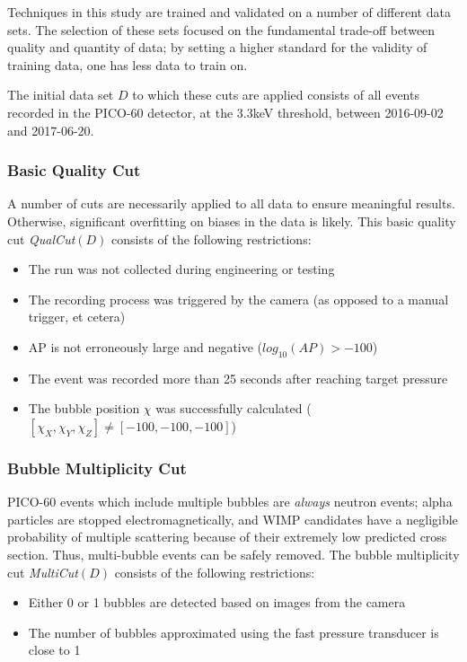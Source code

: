 \documentclass[10pt]{article}
\begin{document}
Techniques in this study are trained and validated on a number of different data sets. The selection of these sets focused on the fundamental trade-off between quality and quantity of data; by setting a higher standard for the validity of training data, one has less data to train on.

The initial data set $D$ to which these cuts are applied consists of all events recorded in the PICO-60 detector, at the 3.3keV threshold, between 2016-09-02 and 2017-06-20.

\subsubsection{Basic Quality Cut}

A number of cuts are necessarily applied to all data to ensure meaningful results. Otherwise, significant overfitting on biases in the data is likely. This basic quality cut {\it QualCut}$(D)$ consists of the following restrictions:

\begin{itemize}
    \item The run was not collected during engineering or testing
    \item The recording process was triggered by the camera (as opposed to a manual trigger, et cetera)
    \item AP is not erroneously large and negative ($log_{10}(AP)>-100$)
    \item The event was recorded more than 25 seconds after reaching target pressure
    \item The bubble position $\chi$ was successfully calculated ($[\chi_{X}, \chi_{Y}, \chi_{Z}]\neq[-100, -100, -100]$)
\end{itemize}

\subsubsection{Bubble Multiplicity Cut}

PICO-60 events which include multiple bubbles are \textit{always} neutron events; alpha particles are stopped electromagnetically, and WIMP candidates have a negligible probability of multiple scattering because of their extremely low predicted cross section. Thus, multi-bubble events can be safely removed. The bubble multiplicity cut {\it MultiCut}$(D)$ consists of the following restrictions:

\begin{itemize}
    \item Either 0 or 1 bubbles are detected based on images from the camera
    \item The number of bubbles approximated using the fast pressure transducer is close to 1
\end{itemize}
\end{document}
